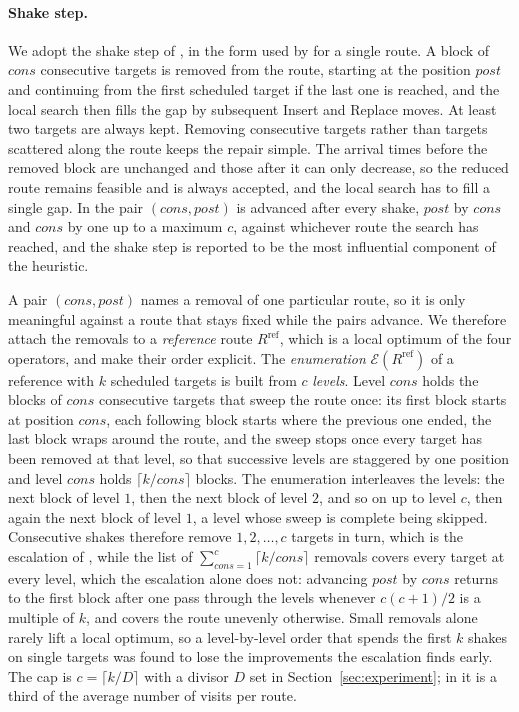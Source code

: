 \documentclass[11pt]{article}
\newcommand{\Rref}{R^{\mathrm{ref}}}     %
\begin{document}
\paragraph{Shake step.}
We adopt the shake step of \citep{vansteenwegen2009iterated}, in the form used by \citep{gunawan2015iterated} for a single route. A block of $\mathit{cons}$ consecutive targets is removed from the route, starting at the position $\mathit{post}$ and continuing from the first scheduled target if the last one is reached, and the local search then fills the gap by subsequent Insert and Replace moves. At least two targets are always kept. Removing consecutive targets rather than targets scattered along the route keeps the repair simple. The arrival times before the removed block are unchanged and those after it can only decrease, so the reduced route remains feasible and is always accepted, and the local search has to fill a single gap. In \citep{vansteenwegen2009iterated} the pair $(\mathit{cons}, \mathit{post})$ is advanced after every shake, $\mathit{post}$ by $\mathit{cons}$ and $\mathit{cons}$ by one up to a maximum $c$, against whichever route the search has reached, and the shake step is reported to be the most influential component of the heuristic.

A pair $(\mathit{cons}, \mathit{post})$ names a removal of one particular route, so it is only meaningful against a route that stays fixed while the pairs advance. We therefore attach the removals to a \emph{reference} route $\Rref$, which is a local optimum of the four operators, and make their order explicit. The \emph{enumeration} $\mathcal{E}(\Rref)$ of a reference with $k$ scheduled targets is built from $c$ \emph{levels}. Level $\mathit{cons}$ holds the blocks of $\mathit{cons}$ consecutive targets that sweep the route once: its first block starts at position $\mathit{cons}$, each following block starts where the previous one ended, the last block wraps around the route, and the sweep stops once every target has been removed at that level, so that successive levels are staggered by one position and level $\mathit{cons}$ holds $\lceil k / \mathit{cons} \rceil$ blocks. The enumeration interleaves the levels: the next block of level $1$, then the next block of level $2$, and so on up to level $c$, then again the next block of level $1$, a level whose sweep is complete being skipped. Consecutive shakes therefore remove $1, 2, \ldots, c$ targets in turn, which is the escalation of \citep{vansteenwegen2009iterated}, while the list of $\sum_{\mathit{cons} = 1}^{c} \lceil k / \mathit{cons} \rceil$ removals covers every target at every level, which the escalation alone does not: advancing $\mathit{post}$ by $\mathit{cons}$ returns to the first block after one pass through the levels whenever $c(c+1)/2$ is a multiple of $k$, and covers the route unevenly otherwise. Small removals alone rarely lift a local optimum, so a level-by-level order that spends the first $k$ shakes on single targets was found to lose the improvements the escalation finds early. The cap is $c = \lceil k / D \rceil$ with a divisor $D$ set in Section~\ref{sec:experiment}; in \citep{vansteenwegen2009iterated} it is a third of the average number of visits per route.
\end{document}
